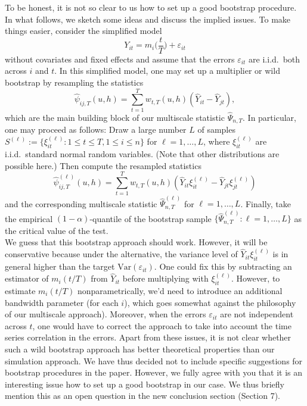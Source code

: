\documentclass[a4paper,12pt]{article}
\begin{document}
\begin{enumerate}[label=\arabic*.,leftmargin=0.6cm]
To be honest, it is not so clear to us how to set up a good bootstrap procedure. In what follows, we sketch some ideas and discuss the implied issues. To make things easier, consider the simplified model 
\[ Y_{it} = m_i\Big(\frac{t}{T}\Big) + \varepsilon_{it} \]
without covariates and fixed effects and assume that the errors $\varepsilon_{it}$ are i.i.d.\ both across $i$ and $t$. In this simplified model, one may set up a multiplier or wild bootstrap by resampling the statistics
\[ \widehat{\psi}_{ij,T}(u,h) = \sum_{t=1}^T w_{t,T}(u,h) (\widehat{Y}_{it} - \widehat{Y}_{jt}), \]
which are the main building block of our multiscale statistic $\widehat{\Psi}_{n,T}$. In particular, one may proceed as follows: Draw a large number $L$ of samples $S^{(\ell)} := \{\xi_{it}^{(\ell)}: 1 \le t \le T, 1 \le i \le n \}$ for $\ell=1,\ldots,L$, where $\xi_{it}^{(\ell)}$ are i.i.d.\ standard normal random variables. (Note that other distributions are possible here.) Then compute the resampled statistics  
\[ \widehat{\psi}_{ij,T}^{(\ell)}(u,h) = \sum_{t=1}^T w_{t,T}(u,h) (\widehat{Y}_{it} \xi_{it}^{(\ell)} - \widehat{Y}_{jt} \xi_{jt}^{(\ell)}) \]
and the corresponding multiscale statistic $\widehat{\Psi}_{n,T}^{(\ell)}$ for $\ell=1,\ldots,L$. Finally, take the empirical $(1-\alpha)$-quantile of the bootstrap sample $\{ \widehat{\Psi}_{n,T}^{(\ell)}:  \ell=1,\ldots,L \}$ as the critical value of the test. \\
We guess that this bootstrap approach should work. However, it will be conservative because under the alternative, the variance level of $\widehat{Y}_{it} \xi_{it}^{(\ell)}$ is in general higher than the target $\text{Var}(\varepsilon_{it})$. One could fix this by subtracting an estimator of $m_i(t/T)$ from $\widehat{Y}_{it}$ before multiplying with $\xi_{it}^{(\ell)}$. However, to estimate $m_i(t/T)$ nonparametrically, we'd need to introduce an additional bandwidth parameter (for each $i$), which goes somewhat against the philosophy of our multiscale approach). Moreover, when the errors $\varepsilon_{it}$ are not independent across $t$, one would have to correct the approach to take into account the time series correlation in the errors. Apart from these issues, it is not clear whether such a wild bootstrap approach has better theoretical properties than our simulation approach. We have thus decided not to include specific suggestions for bootstrap procedures in the paper. However, we fully agree with you that it is an interesting issue how to set up a good bootstrap in our case. We thus briefly mention this as an open question in the new conclusion section (Section 7). 



\end{enumerate}
\end{document}
